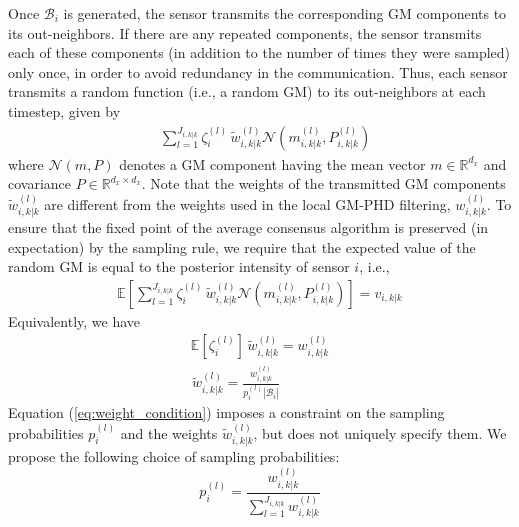 Once $\mathcal B_i$ is generated, the sensor transmits the corresponding GM components to its out-neighbors. If there are any repeated components, the sensor transmits each of these components (in addition to the number of times they were sampled) only once, in order to avoid redundancy in the communication. Thus, each sensor transmits a random function (i.e., a random GM) to its out-neighbors at each timestep, given by
\begin{align}  &\sum_{l=1}^{J_{i,k|k}}\zeta^{(l)}_{i} \hspace{2pt} \tilde w^{(l)}_{i,k|k}\mathcal N(m^{(l)}_{i,k|k}, P^{(l)}_{i,k|k})
    \label{eq:random_GM}
\end{align}
where $\mathcal N(m,P)$ denotes a GM component having the mean vector $m\in \mathbb R^{d_x}$ and covariance $P\in \mathbb R^{d_x \times d_x}$.
Note that the weights of the transmitted GM components $\tilde w^{(l)}_{i,k|k}$ are different from the weights used in the local GM-PHD filtering, $w^{(l)}_{i,k|k}$.
To ensure that the fixed point of the average consensus algorithm is preserved (in expectation) by the sampling rule, we require that the expected value of the random GM is equal to the posterior intensity of sensor $i$, i.e.,
\begin{align}
\mathbb E\left[\sum_{l=1}^{J_{i,k|k}}\zeta^{(l)}_{i} \hspace{2pt} \tilde w^{(l)}_{i,k|k}\mathcal N(m^{(l)}_{i,k|k}, P^{(l)}_{i,k|k})\right] = v_{i,k|k}
\label{eq:exp_randomGM}
\end{align}
Equivalently,
we have
\begin{align}
\mathbb E[\zeta^{(l)}_{i}]\hspace{2pt}\tilde w^{(l)}_{i,k|k} = w^{(l)}_{i,k|k} \label{eq:exp_weight_condition}\\ \hspace{1pt}  \tilde w^{(l)}_{i,k|k} = \frac{w^{(l)}_{i,k|k}}{p_{i}^{(l)}|\mathcal B_i|}
\label{eq:weight_condition}
\end{align}
Equation (\ref{eq:weight_condition}) imposes a constraint on the sampling probabilities $p_{i}^{(l)}$ and the weights $\tilde w_{i,k|k}^{(l)}$, but does not uniquely specify them. 
We propose the following choice of sampling probabilities:
\begin{equation}
p_{i}^{(l)}=\frac{w^{(l)}_{i,k|k}}{\sum_{l=1}^{J_{i,k|k}} w^{(l)}_{i,k|k}}
\label{eq:pl_choice}
\end{equation}
